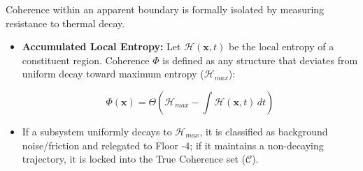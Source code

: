 Coherence within an apparent boundary is formally isolated by measuring resistance to thermal decay.

\begin{itemize}
\item \textbf{Accumulated Local Entropy:} Let \(\mathcal{H}(\mathbf{x}, t)\) be the local entropy of a constituent region. Coherence \(\Phi\) is defined as any structure that deviates from uniform decay toward maximum entropy (\(\mathcal{H}_{max}\)):

\[
\Phi(\mathbf{x}) = \Theta \left( \mathcal{H}_{max} - \int \mathcal{H}(\mathbf{x}, t) \, dt \right)
\]
\item If a subsystem uniformly decays to \(\mathcal{H}_{max}\), it is classified as background noise/friction and relegated to Floor -4; if it maintains a non-decaying trajectory, it is locked into the True Coherence set (\(\mathcal{C}\)).
\end{itemize}
